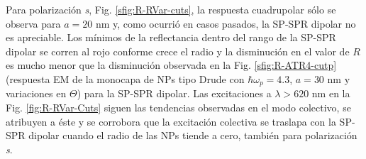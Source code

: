  Para polarización \emph{s}, Fig. \ref{sfig:R-RVar-cuts}, la respuesta cuadrupolar sólo se observa para $a = 20$ nm y, como ocurrió en casos pasados, la SP-SPR dipolar no es apreciable. Los mínimos de la reflectancia dentro del rango de la SP-SPR dipolar se corren al rojo conforme crece el radio y la disminución en el valor de $R$ es mucho menor que la disminución  observada en la Fig. \ref{sfig:R-ATR4-cutp} (respuesta EM de la monocapa de NPs tipo Drude con $\hbar\omega_p = 4.3$, $a = 30$ nm y variaciones en $\Theta$) para la SP-SPR dipolar. Las excitaciones a $\lambda>620$ nm en la Fig. \ref{fig:R-RVar-Cuts} siguen las tendencias observadas en el modo colectivo, se atribuyen a éste y se corrobora que la excitación colectiva se traslapa con la SP-SPR dipolar cuando el radio de las NPs tiende a cero, también para polarización \emph{s}.
 
